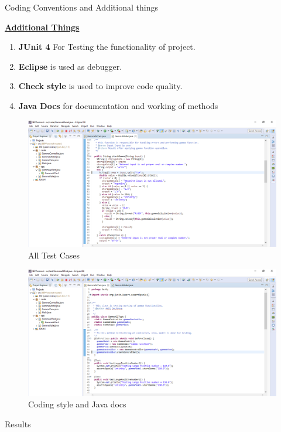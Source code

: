 \documentclass[final]{beamer}
\newlength{\onecolwid}
\newlength{\twocolwid}
\begin{document}
\begin{frame}
\begin{columns}[t]
\begin{column}{\twocolwid}
\begin{columns}[t,totalwidth=\twocolwid]
\begin{column}{\onecolwid}
\begin{exampleblock}{Coding Conventions and Additional things}
{\textbf{\underline{Additional Things}}
\begin{enumerate}
    \item \textbf{JUnit 4} For Testing the functionality of project. 
    \item \textbf{Eclipse} is used as debugger.
    \item \textbf{Check style} is used to improve code quality.
    \item \textbf{Java Docs} for documentation and working of methods
\end{enumerate}}




\end{exampleblock}
\begin{figure}
\includegraphics[width=0.6\linewidth]{img/d4_3.png}
\caption{All Test Cases}
\label{fig:All Test Cases}
\end{figure}

\begin{figure}
\includegraphics[width=0.6\linewidth]{img/d4_4.png}
\caption{Coding style and Java docs}
\label{fig:Coding style and Java docs}
\end{figure}

\begin{exampleblock}{Results}
\begin{tabular}{|p{5cm}|p{11cm}|p{8cm}|}


\end{tabular}
\end{exampleblock}
\end{column}
\end{columns}
\end{column}
\end{columns}
\end{frame}
\end{document}

